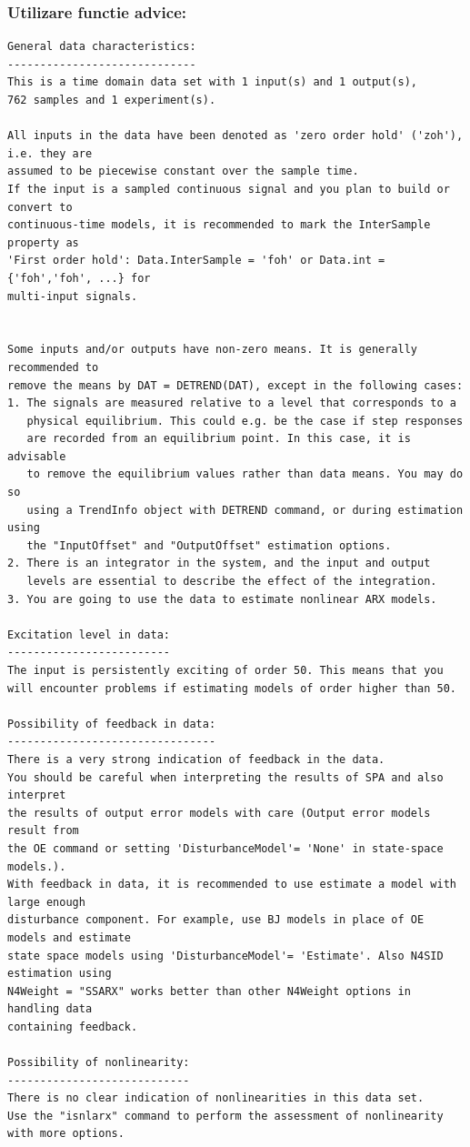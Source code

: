\documentclass[12pt,english]{article}
\begin{document}
\subsubsection {Utilizare functie advice: }
\begin{lstlisting}
General data characteristics:
-----------------------------
This is a time domain data set with 1 input(s) and 1 output(s),
762 samples and 1 experiment(s).

All inputs in the data have been denoted as 'zero order hold' ('zoh'), i.e. they are
assumed to be piecewise constant over the sample time.
If the input is a sampled continuous signal and you plan to build or convert to
continuous-time models, it is recommended to mark the InterSample property as
'First order hold': Data.InterSample = 'foh' or Data.int = {'foh','foh', ...} for
multi-input signals.


Some inputs and/or outputs have non-zero means. It is generally recommended to
remove the means by DAT = DETREND(DAT), except in the following cases:
1. The signals are measured relative to a level that corresponds to a
   physical equilibrium. This could e.g. be the case if step responses
   are recorded from an equilibrium point. In this case, it is advisable
   to remove the equilibrium values rather than data means. You may do so
   using a TrendInfo object with DETREND command, or during estimation using
   the "InputOffset" and "OutputOffset" estimation options.
2. There is an integrator in the system, and the input and output 
   levels are essential to describe the effect of the integration.
3. You are going to use the data to estimate nonlinear ARX models.

Excitation level in data:
-------------------------
The input is persistently exciting of order 50. This means that you
will encounter problems if estimating models of order higher than 50.

Possibility of feedback in data:
--------------------------------
There is a very strong indication of feedback in the data.
You should be careful when interpreting the results of SPA and also interpret
the results of output error models with care (Output error models result from
the OE command or setting 'DisturbanceModel'= 'None' in state-space models.).
With feedback in data, it is recommended to use estimate a model with large enough 
disturbance component. For example, use BJ models in place of OE models and estimate 
state space models using 'DisturbanceModel'= 'Estimate'. Also N4SID estimation using 
N4Weight = "SSARX" works better than other N4Weight options in handling data 
containing feedback.

Possibility of nonlinearity:
----------------------------
There is no clear indication of nonlinearities in this data set.
Use the "isnlarx" command to perform the assessment of nonlinearity with more options.

\end{lstlisting}
\end{document}
